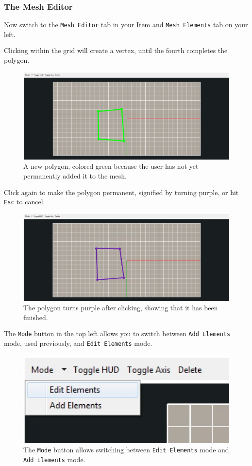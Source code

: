 \subsubsection{The Mesh Editor}

Now switch to the \texttt{Mesh Editor} tab in your Item and \texttt{Mesh
Elements} tab on your left.

Clicking within the grid will create a vertex, until the fourth completes the
polygon.

\begin{figure}[!h]
\includegraphics[width=12cm]{images/AddPolygon}
\centering
\caption{A new polygon, colored green because the user has not yet permanently
added it to the mesh.}
\label{fig:addpolygon}
\end{figure}

Click again to make the polygon permanent, signified by turning purple, or hit
\texttt{Esc} to cancel.

\begin{figure}[!h]
\includegraphics[width=12cm]{images/NewPolygon}
\centering
\caption{The polygon turns purple after clicking, showing that it has been
finished.}
\label{fig:newpolygon}
\end{figure}

The \texttt{Mode} button in the top left allows you to switch between
\texttt{Add Elements} mode, used previously, and \texttt{Edit Elements} mode.

\begin{figure}[!h]
\includegraphics[width=12cm]{images/EditMode}
\centering
\caption{The \texttt{Mode} button allows switching between \texttt{Edit
Elements} mode and \texttt{Add Elements} mode.}
\label{fig:editmode}
\end{figure}

